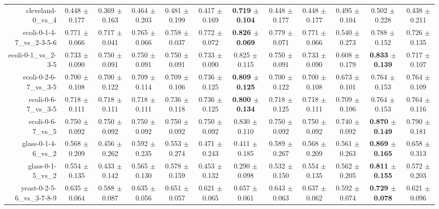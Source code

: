 \begin{table}[!ht]
{\begin{tabular}{r c c c c c c c c c c c}
cleveland-0\_vs\_4 & 0.448 $\pm$ 0.177 & 0.369 $\pm$ 0.163 & 0.464 $\pm$ 0.203 & 0.481 $\pm$ 0.199 & 0.417 $\pm$ 0.169 & \textbf{0.719 $\pm$ 0.104} & 0.448 $\pm$ 0.177 & 0.448 $\pm$ 0.177 & 0.495 $\pm$ 0.104 & 0.502 $\pm$ 0.228 & 0.438 $\pm$ 0.211 \\
ecoli-0-1-4-7\_vs\_2-3-5-6 & 0.771 $\pm$ 0.066 & 0.717 $\pm$ 0.041 & 0.765 $\pm$ 0.066 & 0.758 $\pm$ 0.037 & 0.772 $\pm$ 0.072 & \textbf{0.826 $\pm$ 0.069} & 0.779 $\pm$ 0.071 & 0.771 $\pm$ 0.066 & 0.540 $\pm$ 0.273 & 0.788 $\pm$ 0.152 & 0.726 $\pm$ 0.135 \\
ecoli-0-1\_vs\_2-3-5 & 0.733 $\pm$ 0.090 & 0.750 $\pm$ 0.091 & 0.750 $\pm$ 0.091 & 0.750 $\pm$ 0.091 & 0.733 $\pm$ 0.090 & 0.825 $\pm$ 0.115 & 0.750 $\pm$ 0.091 & 0.733 $\pm$ 0.090 & 0.608 $\pm$ 0.179 & \textbf{0.833 $\pm$ 0.139} & 0.717 $\pm$ 0.107 \\
ecoli-0-2-6-7\_vs\_3-5 & 0.700 $\pm$ 0.108 & 0.700 $\pm$ 0.122 & 0.709 $\pm$ 0.114 & 0.709 $\pm$ 0.106 & 0.736 $\pm$ 0.125 & \textbf{0.809 $\pm$ 0.125} & 0.700 $\pm$ 0.122 & 0.700 $\pm$ 0.108 & 0.673 $\pm$ 0.101 & 0.764 $\pm$ 0.153 & 0.764 $\pm$ 0.109 \\
ecoli-0-6-7\_vs\_3-5 & 0.718 $\pm$ 0.111 & 0.718 $\pm$ 0.111 & 0.718 $\pm$ 0.111 & 0.736 $\pm$ 0.118 & 0.736 $\pm$ 0.125 & \textbf{0.800 $\pm$ 0.134} & 0.718 $\pm$ 0.125 & 0.718 $\pm$ 0.111 & 0.709 $\pm$ 0.106 & 0.764 $\pm$ 0.153 & 0.764 $\pm$ 0.116 \\
ecoli-0-6-7\_vs\_5 & 0.750 $\pm$ 0.092 & 0.750 $\pm$ 0.092 & 0.750 $\pm$ 0.092 & 0.750 $\pm$ 0.092 & 0.750 $\pm$ 0.092 & 0.830 $\pm$ 0.110 & 0.750 $\pm$ 0.092 & 0.750 $\pm$ 0.092 & 0.740 $\pm$ 0.092 & \textbf{0.870 $\pm$ 0.149} & 0.790 $\pm$ 0.181 \\
glass-0-1-4-6\_vs\_2 & 0.568 $\pm$ 0.209 & 0.456 $\pm$ 0.262 & 0.592 $\pm$ 0.235 & 0.553 $\pm$ 0.274 & 0.471 $\pm$ 0.243 & 0.411 $\pm$ 0.185 & 0.589 $\pm$ 0.267 & 0.568 $\pm$ 0.209 & 0.561 $\pm$ 0.263 & \textbf{0.869 $\pm$ 0.165} & 0.658 $\pm$ 0.313 \\
glass-0-1-5\_vs\_2 & 0.554 $\pm$ 0.135 & 0.433 $\pm$ 0.142 & 0.565 $\pm$ 0.130 & 0.578 $\pm$ 0.159 & 0.453 $\pm$ 0.132 & 0.290 $\pm$ 0.098 & 0.532 $\pm$ 0.150 & 0.554 $\pm$ 0.135 & 0.562 $\pm$ 0.205 & \textbf{0.811 $\pm$ 0.155} & 0.572 $\pm$ 0.203 \\
yeast-0-2-5-6\_vs\_3-7-8-9 & 0.635 $\pm$ 0.064 & 0.588 $\pm$ 0.087 & 0.635 $\pm$ 0.056 & 0.651 $\pm$ 0.057 & 0.621 $\pm$ 0.065 & 0.657 $\pm$ 0.061 & 0.643 $\pm$ 0.063 & 0.637 $\pm$ 0.062 & 0.592 $\pm$ 0.074 & \textbf{0.729 $\pm$ 0.078} & 0.621 $\pm$ 0.096 \\

\end{tabular}}
\end{table}

